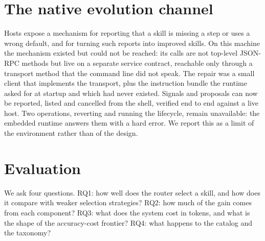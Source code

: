 \documentclass[sigconf,acmsmall]{acmart}
\begin{document}
\section{The native evolution channel}
Hosts expose a mechanism for reporting that a skill is missing a step or uses a wrong default, and for turning such reports into improved skills. On this machine the mechanism existed but could not be reached: its calls are not top-level JSON-RPC methods but live on a separate service contract, reachable only through a transport method that the command line did not speak. The repair was a small client that implements the transport, plus the instruction bundle the runtime asked for at startup and which had never existed. Signals and proposals can now be reported, listed and cancelled from the shell, verified end to end against a live host.
Two operations, reverting and running the lifecycle, remain unavailable: the embedded runtime answers them with a hard error. We report this as a limit of the environment rather than of the design.

\section{Evaluation}
We ask four questions. RQ1: how well does the router select a skill, and how does it compare with weaker selection strategies? RQ2: how much of the gain comes from each component? RQ3: what does the system cost in tokens, and what is the shape of the accuracy-cost frontier? RQ4: what happens to the catalog and the taxonomy?
\end{document}
